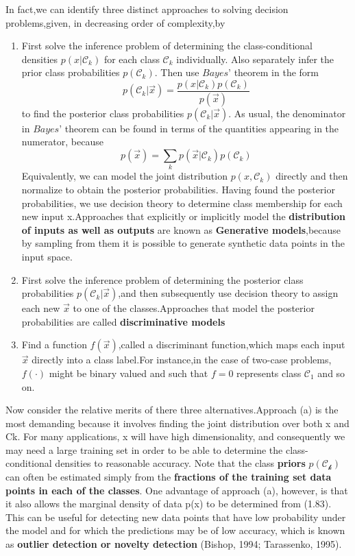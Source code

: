 In fact,we can identify three distinct approaches to solving decision problems,given, in decreasing order of complexity,by
\begin{enumerate} %
	\item First solve the inference problem of determining the class-conditional densities
	$p(x|\mathcal{C}_k)$ for each class $\mathcal{C}_k$ individually. Also separately infer the prior class probabilities $p(\mathcal{C}_k)$. Then use $Bayes’$ theorem in the form 
	\begin{equation}
	p(\mathcal{C}_k|\vec{x}) = \dfrac{p(x|\mathcal{C}_k)p(\mathcal{C}_k)}{p(\vec{x})}
	\end{equation}
	to find the posterior class probabilities $p(\mathcal{C}_k|\vec{x})$. As usual, the denominator in $Bayes’$ theorem can be found in terms of the quantities appearing in the
	numerator, because
	\begin{equation}
	p(\vec{x}) = \sum_k{p(\vec{x}|\mathcal{C}_k)p(\mathcal{C}_k)}
	\end{equation}
	Equivalently, we can model the joint distribution $p(x, \mathcal{C}_k)$ directly and then
	normalize to obtain the posterior probabilities. Having found the posterior
	probabilities, we use decision theory to determine class membership for each new input x.Approaches that explicitly or implicitly model the \textbf{distribution of inputs as well as outputs} are known as \textbf{Generative models},because by sampling from them it is possible to generate synthetic data points in the input space.
	\item First solve the inference problem of determining the posterior class probabilities $p(\mathcal{C}_k|\vec{x})$,and then subsequently use decision theory to assign each new $\vec{x}$ to one of the classes.Approaches that model the posterior probabilities are called \textbf{discriminative models}
	\item Find a function $f(\vec{x})$,called a discriminant function,which maps each input $\vec{x}$ directly into a class label.For instance,in the case of two-case problems,$f(\cdot)$ might be binary valued and such that $f=0$ represents class $\mathcal{C}_1$ and so on.
\end{enumerate}
Now consider the relative merits of there three alternatives.Approach (a) is the
most demanding because it involves finding the joint distribution over both x and
Ck. For many applications, x will have high dimensionality, and consequently we
may need a large training set in order to be able to determine the class-conditional
densities to reasonable accuracy. Note that the class \textbf{priors} $p(\mathcal{C_k})$ can often be estimated simply from the \textbf{fractions of the training set data points in each of the classes}. One advantage of approach (a), however, is that it also allows the marginal density of data p(x) to be determined from (1.83). This can be useful for detecting new data
points that have low probability under the model and for which the predictions may
be of low accuracy, which is known as \textbf{outlier detection or novelty detection} (Bishop,
1994; Tarassenko, 1995).

